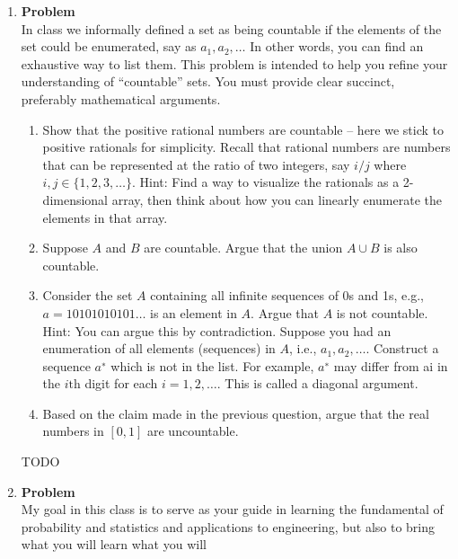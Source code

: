 \documentclass[12pt]{article}
\newenvironment{Ex}{\textbf{Problem}\vspace{.75em}\\}{}
\begin{document}
\begin{enumerate}
\begin{Ex}
\begin{solution}
\begin{enumerate}
      \end{enumerate}
    \end{solution}
  \end{Ex}
\item 
  \begin{Ex}
    In class we informally defined a set as being countable if the
    elements of the set could be enumerated, say as
    $a_1,a_2,\ldots$ In other words, you can find an exhaustive way
    to list them. This problem is intended to help you refine your
    understanding of ``countable'' sets. You must provide clear
    succinct, preferably mathematical arguments.
    \begin{enumerate}
    \item Show that the positive rational numbers are countable --
      here we stick to positive rationals for simplicity. Recall that
      rational numbers are numbers that can be represented at the
      ratio of two integers, say $i/j$ where $i, j \in \{1, 2, 3,
      \ldots\}$. Hint: Find a way to visualize the rationals as a
      2-dimensional array, then think about how you can linearly
      enumerate the elements in that array.
    \item Suppose $A$ and $B$ are countable. Argue that the union $A
      \cup B$ is also countable.
    \item Consider the set $A$ containing all infinite sequences of 0s
      and 1s, e.g., $a = 10101010101\ldots$ is an element in
      $A$. Argue that $A$ is not countable. Hint: You can argue this
      by contradiction. Suppose you had an enumeration of all elements
      (sequences) in $A$, i.e., $a_1, a_2,\ldots$. Construct a
      sequence $a^∗$ which is not in the list. For example, $a^∗$ may
      differ from ai in the $i\text{th}$ digit for each $i = 1, 2,
      \ldots$. This is called a diagonal argument.
    \item Based on the claim made in the previous question, argue that
      the real numbers in $[0, 1]$ are uncountable.
    \end{enumerate}
    \begin{solution} \hfill
      {\huge TODO}
    \end{solution}
  \end{Ex}
\item 
  \begin{Ex}
    My goal in this class is to serve as your guide in learning the
    fundamental of probability and statistics and applications to
    engineering, but also to bring what you will learn what you will

\end{Ex}
\end{enumerate}
\end{document}
